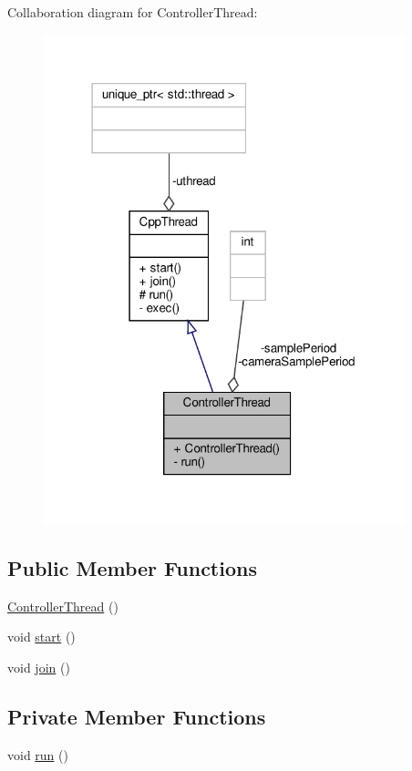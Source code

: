 Collaboration diagram for Controller\+Thread\+:\nopagebreak
\begin{figure}[H]
\begin{center}
\leavevmode
\includegraphics[width=297pt]{classControllerThread__coll__graph}
\end{center}
\end{figure}
\subsection*{Public Member Functions}
\begin{DoxyCompactItemize}
\item 
\hyperlink{classControllerThread_a00cd6502504f5f1e680e6be3f60a987d}{Controller\+Thread} ()
\item 
void \hyperlink{classCppThread_a1be46d1be000f41a763289300623c609}{start} ()
\item 
void \hyperlink{classCppThread_a8ff0fda6b913cc53764caef0e1200f3f}{join} ()
\end{DoxyCompactItemize}
\subsection*{Private Member Functions}
\begin{DoxyCompactItemize}
\item 
void \hyperlink{classControllerThread_ae8206a23ab1a414f2956424def2e759c}{run} ()
\end{DoxyCompactItemize}
